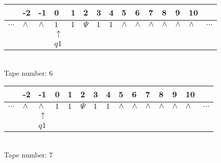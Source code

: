\documentclass{article}
\begin{document}
\begin{table}[H]
\centering
\begin{tabular}{lllllllllllllll}
 & -2 & -1 & 0 & 1 & 2 & 3 & 4 & 5 & 6 & 7 & 8 & 9 & 10 & \\
\hline
$...$ & \multicolumn{1}{|l|}{$\wedge$} & \multicolumn{1}{|l|}{$\wedge$} & \multicolumn{1}{|l|}{$1$} & \multicolumn{1}{|l|}{$1$} & \multicolumn{1}{|l|}{$\Psi$} & \multicolumn{1}{|l|}{$1$} & \multicolumn{1}{|l|}{$1$} & \multicolumn{1}{|l|}{$\wedge$} & \multicolumn{1}{|l|}{$\wedge$} & \multicolumn{1}{|l|}{$\wedge$} & \multicolumn{1}{|l|}{$\wedge$} & \multicolumn{1}{|l|}{$\wedge$} & \multicolumn{1}{|l|}{$\wedge$} & $...$\\
\hline
&  &  & $\uparrow$ &  &  &  &  &  &  &  &  &  &  &  \\
&  &  & $ q1 $ &  &  &  &  &  &  &  &  &  &  &  \\
\end{tabular}
\\
Tape number: 6
\noindent\makebox[\linewidth]{\hdashrule{\textwidth}{1pt}{1pt}}\end{table}
\clearpage

\begin{table}[H]
\centering
\begin{tabular}{lllllllllllllll}
 & -2 & -1 & 0 & 1 & 2 & 3 & 4 & 5 & 6 & 7 & 8 & 9 & 10 & \\
\hline
$...$ & \multicolumn{1}{|l|}{$\wedge$} & \multicolumn{1}{|l|}{$\wedge$} & \multicolumn{1}{|l|}{$1$} & \multicolumn{1}{|l|}{$1$} & \multicolumn{1}{|l|}{$\Psi$} & \multicolumn{1}{|l|}{$1$} & \multicolumn{1}{|l|}{$1$} & \multicolumn{1}{|l|}{$\wedge$} & \multicolumn{1}{|l|}{$\wedge$} & \multicolumn{1}{|l|}{$\wedge$} & \multicolumn{1}{|l|}{$\wedge$} & \multicolumn{1}{|l|}{$\wedge$} & \multicolumn{1}{|l|}{$\wedge$} & $...$\\
\hline
&  & $\uparrow$ &  &  &  &  &  &  &  &  &  &  &  &  \\
&  & $ q1 $ &  &  &  &  &  &  &  &  &  &  &  &  \\
\end{tabular}
\\
Tape number: 7
\noindent\makebox[\linewidth]{\hdashrule{\textwidth}{1pt}{1pt}}\end{table}
\end{document}
